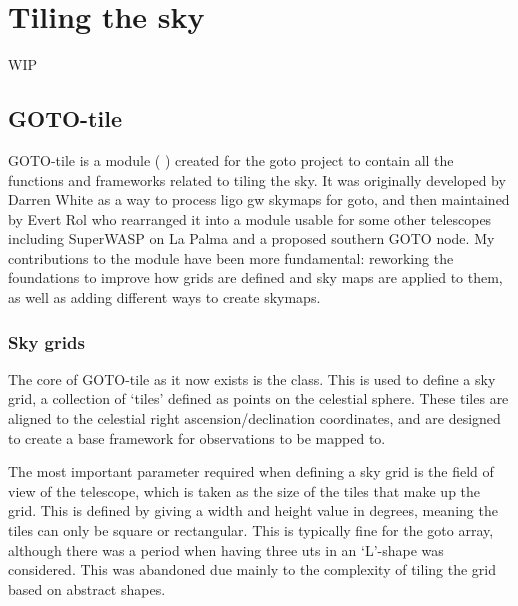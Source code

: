 \section{Tiling the sky}
\label{sec:tiling}
\begin{colsection}


\begin{colsection}

WIP

\end{colsection}


\subsection{GOTO-tile}
\label{sec:gototile}
\begin{colsection}

GOTO-tile is a  module ( ) created for the \gls{goto} project to contain all the functions and frameworks related to tiling the sky. It was originally developed by Darren White as a way to process \gls{ligo} \gls{gw} skymaps for \gls{goto}, and then maintained by Evert Rol who rearranged it into a module usable for some other telescopes including SuperWASP on La Palma and a proposed southern GOTO node. My contributions to the module have been more fundamental: reworking the foundations to improve how grids are defined and sky maps are applied to them, as well as adding different ways to create skymaps.

\subsubsection{Sky grids}

The core of GOTO-tile as it now exists is the  class. This is used to define a sky grid, a collection of `tiles' defined as points on the celestial sphere. These tiles are aligned to the celestial right ascension/declination coordinates, and are designed to create a base framework for observations to be mapped to.

The most important parameter required when defining a sky grid is the field of view of the telescope, which is taken as the size of the tiles that make up the grid. This is defined by giving a width and height value in degrees, meaning the tiles can only be square or rectangular. This is typically fine for the \gls{goto} array, although there was a period when having three \glspl{ut} in an `L'-shape was considered. This was abandoned due mainly to the complexity of tiling the grid based on abstract shapes.


\end{colsection}
\end{colsection}
